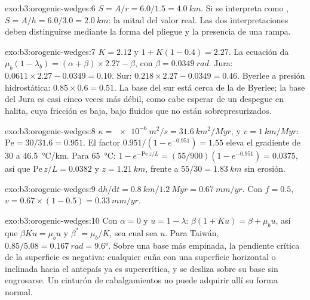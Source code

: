 \begin{solution}{exo:b3:orogenic-wedges:6}
$S = A/r = 6.0/1.5 = \qty{4.0}{km}$. Si se interpreta como , $S = A/h =
6.0/3.0 = \qty{2.0}{km}$: la mitad del valor real. Las dos interpretaciones deben distinguirse
mediante la forma del pliegue y la presencia de una rampa.
\end{solution}

\begin{solution}{exo:b3:orogenic-wedges:7}
$K = 2.12$ y $1 + K(1 - 0.4) = 2.27$. La ecuación da $\mu_b(1 -
\lambda_b) = (\alpha + \beta)\times2.27 - \beta$, con $\beta =
\qty{0.0349}{rad}$. Jura: $0.0611\times2.27 - 0.0349 = 0.10$. Sur:
$0.218\times2.27 - 0.0349 = 0.46$. Byerlee a presión hidrostática:
$0.85\times0.6 = 0.51$. La base del sur está cerca de la de Byerlee; la
base del Jura es casi cinco veces más débil, como cabe esperar de un despegue en
halita, cuya fricción es baja, bajo fluidos que no están sobrepresurizados.
\end{solution}

\begin{solution}{exo:b3:orogenic-wedges:8}
$\kappa = \qty{e-6}{m^2/s} = \qty{31.6}{km^2/Myr}$, y $v =
\qty{1}{km/Myr}$: $\mathrm{Pe} = 30/31.6 = 0.951$. El factor $0.951/(1 -
e^{-0.951}) = 1.55$ eleva el gradiente de 30 a \qty{46.5}{\celsius/km}.
Para \qty{65}{\celsius}: $1 - e^{-\mathrm{Pe}\,z/L} = (55/900)(1 - e^{-0.951})
= 0.0375$, así que $\mathrm{Pe}\,z/L = 0.0382$ y $z = \qty{1.21}{km}$, frente a
$55/30 = \qty{1.83}{km}$ sin erosión.
\end{solution}

\begin{solution}{exo:b3:orogenic-wedges:9}
$\mathrm dh/\mathrm dt = \qty{0.8}{km}/\qty{1.2}{Myr} = \qty{0.67}{mm/yr}$.
Con $f = 0.5$, $v = 0.67\times(1 - 0.5) = \qty{0.33}{mm/yr}$.
\end{solution}

\begin{solution}{exo:b3:orogenic-wedges:10}
Con $\alpha = 0$ y $u = 1 - \lambda$: $\beta(1 + Ku) = \beta + \mu_b u$,
así que $\beta Ku = \mu_b u$ y $\beta^* = \mu_b/K$, sea cual sea $u$. Para Taiwán,
$0.85/5.08 = \qty{0.167}{rad} = \ang{9.6}$. Sobre una base más empinada, la pendiente crítica
de la superficie es negativa: cualquier cuña con una superficie horizontal o inclinada hacia el antepaís
ya es supercrítica, y se desliza sobre su base sin engrosarse. Un
cinturón de cabalgamientos no puede adquirir allí su forma normal.
\end{solution}

